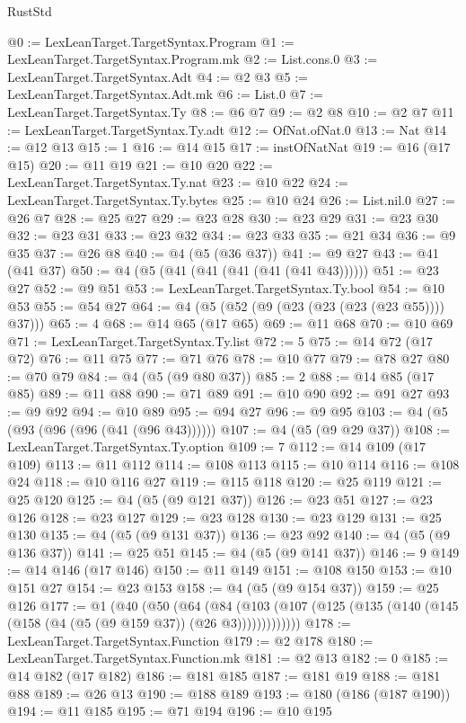 \begin{lexlean}{RustStd}
\begin{coremodule}
@0 := LexLeanTarget.TargetSyntax.Program
@1 := LexLeanTarget.TargetSyntax.Program.mk
@2 := List.cons.{0}
@3 := LexLeanTarget.TargetSyntax.Adt
@4 := @2 @3
@5 := LexLeanTarget.TargetSyntax.Adt.mk
@6 := List.{0}
@7 := LexLeanTarget.TargetSyntax.Ty
@8 := @6 @7
@9 := @2 @8
@10 := @2 @7
@11 := LexLeanTarget.TargetSyntax.Ty.adt
@12 := OfNat.ofNat.{0}
@13 := Nat
@14 := @12 @13
@15 := 1
@16 := @14 @15
@17 := instOfNatNat
@19 := @16 (@17 @15)
@20 := @11 @19
@21 := @10 @20
@22 := LexLeanTarget.TargetSyntax.Ty.nat
@23 := @10 @22
@24 := LexLeanTarget.TargetSyntax.Ty.bytes
@25 := @10 @24
@26 := List.nil.{0}
@27 := @26 @7
@28 := @25 @27
@29 := @23 @28
@30 := @23 @29
@31 := @23 @30
@32 := @23 @31
@33 := @23 @32
@34 := @23 @33
@35 := @21 @34
@36 := @9 @35
@37 := @26 @8
@40 := @4 (@5 (@36 @37))
@41 := @9 @27
@43 := @41 (@41 @37)
@50 := @4 (@5 (@41 (@41 (@41 (@41 (@41 @43))))))
@51 := @23 @27
@52 := @9 @51
@53 := LexLeanTarget.TargetSyntax.Ty.bool
@54 := @10 @53
@55 := @54 @27
@64 := @4 (@5 (@52 (@9 (@23 (@23 (@23 (@23 @55)))) @37)))
@65 := 4
@68 := @14 @65 (@17 @65)
@69 := @11 @68
@70 := @10 @69
@71 := LexLeanTarget.TargetSyntax.Ty.list
@72 := 5
@75 := @14 @72 (@17 @72)
@76 := @11 @75
@77 := @71 @76
@78 := @10 @77
@79 := @78 @27
@80 := @70 @79
@84 := @4 (@5 (@9 @80 @37))
@85 := 2
@88 := @14 @85 (@17 @85)
@89 := @11 @88
@90 := @71 @89
@91 := @10 @90
@92 := @91 @27
@93 := @9 @92
@94 := @10 @89
@95 := @94 @27
@96 := @9 @95
@103 := @4 (@5 (@93 (@96 (@96 (@41 (@96 @43))))))
@107 := @4 (@5 (@9 @29 @37))
@108 := LexLeanTarget.TargetSyntax.Ty.option
@109 := 7
@112 := @14 @109 (@17 @109)
@113 := @11 @112
@114 := @108 @113
@115 := @10 @114
@116 := @108 @24
@118 := @10 @116 @27
@119 := @115 @118
@120 := @25 @119
@121 := @25 @120
@125 := @4 (@5 (@9 @121 @37))
@126 := @23 @51
@127 := @23 @126
@128 := @23 @127
@129 := @23 @128
@130 := @23 @129
@131 := @25 @130
@135 := @4 (@5 (@9 @131 @37))
@136 := @23 @92
@140 := @4 (@5 (@9 @136 @37))
@141 := @25 @51
@145 := @4 (@5 (@9 @141 @37))
@146 := 9
@149 := @14 @146 (@17 @146)
@150 := @11 @149
@151 := @108 @150
@153 := @10 @151 @27
@154 := @23 @153
@158 := @4 (@5 (@9 @154 @37))
@159 := @25 @126
@177 := @1
    (@40
      (@50
        (@64
          (@84 (@103 (@107 (@125 (@135 (@140 (@145 (@158 (@4 (@5 (@9 @159 @37)) (@26 @3)))))))))))))
@178 := LexLeanTarget.TargetSyntax.Function
@179 := @2 @178
@180 := LexLeanTarget.TargetSyntax.Function.mk
@181 := @2 @13
@182 := 0
@185 := @14 @182 (@17 @182)
@186 := @181 @185
@187 := @181 @19
@188 := @181 @88
@189 := @26 @13
@190 := @188 @189
@193 := @180 (@186 (@187 @190))
@194 := @11 @185
@195 := @71 @194
@196 := @10 @195

\end{coremodule}
\end{lexlean}
